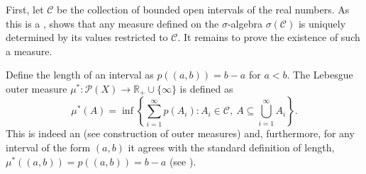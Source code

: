\documentclass[12pt]{article}
\begin{document}
First, let $\mathcal{C}$ be the collection of bounded open intervals of the real numbers. As this is a ,  shows that any measure defined on the $\sigma$-algebra $\sigma(\mathcal{C})$ is uniquely determined by its values restricted to $\mathcal{C}$. It remains to prove the existence of such a measure.

Define the length of an interval as $p((a,b))=b-a$ for $a<b$. The Lebesgue outer measure $\mu^*\colon\mathcal{P}(X)\rightarrow\mathbb{R}_+\cup\{\infty\}$ is defined as
\begin{equation}\label{eq:1}
\mu^*(A)=\inf\left\{\sum_{i=1}^\infty p(A_i): A_i\in\mathcal{C},\ A\subseteq\bigcup_{i=1}^\infty A_i\right\}.
\end{equation}
This is indeed an  (see construction of outer measures) and, furthermore, for any interval of the form $(a,b)$ it agrees with the standard definition of length, $\mu^*((a,b))=p((a,b))=b-a$ (see ).
\end{document}
